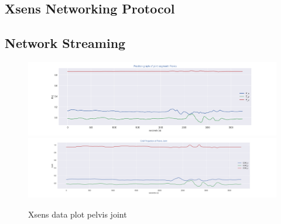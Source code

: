 \subsection{Xsens Networking Protocol}
\subsection{Network Streaming}

\begin{figure}[h!]
    \centering
    \includegraphics[scale=0.435]{images/xsens-pelvis-position.png}\hfill
    \includegraphics[scale=0.35]{images/xsens-pelvis-com.png}\hfill
    \caption{Xsens data plot pelvis joint}\hfill
    \label{fig: xsens-plot}
\end{figure}